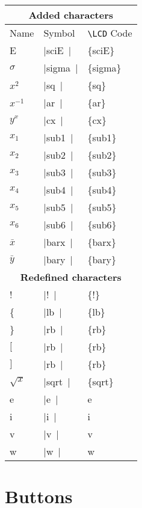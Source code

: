 \documentclass[a4paper,12pt]{article}
\newcommand{\LCDsymb}[1]{\large \textLCD{1}|{#1}~|}
\newcommand{\printcmd}[1]{\texttt{\textbackslash #1}}
\begin{document}
\begin{center}
	\begin{tabular}{|l|l|>{\ttfamily}l|}
		\multicolumn{3}{c}{\textbf{Added characters}} \\
		\hline
		Name       & Symbol          &\textnormal{\printcmd{LCD} Code} \\
		\hline
		E          & \LCDsymb{sciE}  & \{sciE\} \\
		$\sigma$   & \LCDsymb{sigma} & \{sigma\} \\
		$x^2$      & \LCDsymb{sq}    & \{sq\} \\
		$x^{-1}$   & \LCDsymb{ar}    & \{ar\} \\
		$y^x$      & \LCDsymb{cx}    & \{cx\} \\
		$x_1$      & \LCDsymb{sub1}  & \{sub1\} \\
		$x_2$      & \LCDsymb{sub2}  & \{sub2\} \\
		$x_3$      & \LCDsymb{sub3}  & \{sub3\} \\
		$x_4$      & \LCDsymb{sub4}  & \{sub4\} \\
		$x_5$      & \LCDsymb{sub5}  & \{sub5\} \\
		$x_6$      & \LCDsymb{sub6}  & \{sub6\} \\
		$\bar x$   & \LCDsymb{barx}  & \{barx\} \\
		$\bar y$   & \LCDsymb{bary}  & \{bary\} \\
		\hline
		\multicolumn{3}{c}{\textbf{Redefined characters}} \\
		\hline
		!          & \LCDsymb{!}     & \{!\} \\
		\{         & \LCDsymb{lb}    & \{lb\} \\
		\}         & \LCDsymb{rb}    & \{rb\} \\
		$[$        & \LCDsymb{rb}    & \{rb\} \\
		$]$        & \LCDsymb{rb}    & \{rb\} \\
		$\sqrt{x}$ & \LCDsymb{sqrt}  & \{sqrt\} \\
		e          & \LCDsymb{e}     & e \\
		i          & \LCDsymb{i}     & i \\
		v          & \LCDsymb{v}     & v \\
		w          & \LCDsymb{w}     & w \\
		\hline
	\end{tabular}
\end{center}

\part{Buttons}
\end{document}
